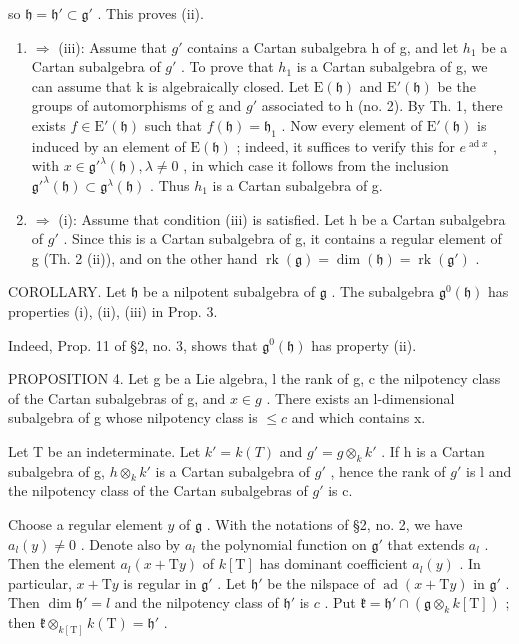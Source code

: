 so \(\mathfrak{h} = \mathfrak{h}'\subset \mathfrak{g}'\) . This proves (ii).

\begin{enumerate}
\def\labelenumi{(\roman{enumi})}
\setcounter{enumi}{1}
\item
  \(\Longrightarrow\) (iii): Assume that \(g'\) contains a Cartan subalgebra h of g, and let \(h_{1}\) be a Cartan subalgebra of \(g'\) . To prove that \(h_{1}\) is a Cartan subalgebra of g, we can assume that k is algebraically closed. Let \(\mathrm{E}(\mathfrak{h})\) and \(\mathrm{E}'(\mathfrak{h})\) be the groups of automorphisms of g and \(g'\) associated to h (no. 2). By Th. 1, there exists \(f \in \mathrm{E}'(\mathfrak{h})\) such that \(f(\mathfrak{h}) = \mathfrak{h}_{1}\) . Now every element of \(\mathrm{E}'(\mathfrak{h})\) is induced by an element of \(\mathrm{E}(\mathfrak{h})\) ; indeed, it suffices to verify this for \(e^{\operatorname{ad} x}\) , with \(x \in \mathfrak{g}'^{\lambda}(\mathfrak{h}), \lambda \neq 0\) , in which case it follows from the inclusion \(\mathfrak{g}'^{\lambda}(\mathfrak{h}) \subset \mathfrak{g}^{\lambda}(\mathfrak{h})\) . Thus \(h_{1}\) is a Cartan subalgebra of g.
\item
  \(\Longrightarrow\) (i): Assume that condition (iii) is satisfied. Let h be a Cartan subalgebra of \(g'\) . Since this is a Cartan subalgebra of g, it contains a regular element of g (Th. 2 (ii)), and on the other hand \(\operatorname{rk}(\mathfrak{g}) = \dim(\mathfrak{h}) = \operatorname{rk}(\mathfrak{g}')\) .
\end{enumerate}

COROLLARY. Let \(\mathfrak{h}\) be a nilpotent subalgebra of \(\mathfrak{g}\) . The subalgebra \(\mathfrak{g}^0 (\mathfrak{h})\) has properties (i), (ii), (iii) in Prop. 3.

Indeed, Prop. 11 of §2, no. 3, shows that \(\mathfrak{g}^0 (\mathfrak{h})\) has property (ii).

PROPOSITION 4. Let g be a Lie algebra, l the rank of g, c the nilpotency class of the Cartan subalgebras of g, and \(x \in g\) . There exists an l-dimensional subalgebra of g whose nilpotency class is \(\leq c\) and which contains x.

Let T be an indeterminate. Let \(k' = k(T)\) and \(g' = g \otimes_k k'\) . If h is a Cartan subalgebra of g, \(h \otimes_k k'\) is a Cartan subalgebra of \(g'\) , hence the rank of \(g'\) is l and the nilpotency class of the Cartan subalgebras of \(g'\) is c.

Choose a regular element \(y\) of \(\mathfrak{g}\) . With the notations of §2, no. 2, we have \(a_l(y) \neq 0\) . Denote also by \(a_l\) the polynomial function on \(\mathfrak{g}'\) that extends \(a_l\) . Then the element \(a_l(x + \mathrm{T}y)\) of \(k[\mathrm{T}]\) has dominant coefficient \(a_l(y)\) . In particular, \(x + \mathrm{T}y\) is regular in \(\mathfrak{g}'\) . Let \(\mathfrak{h}'\) be the nilspace of \(\operatorname{ad}(x + \mathrm{T}y)\) in \(\mathfrak{g}'\) . Then \(\dim \mathfrak{h}' = l\) and the nilpotency class of \(\mathfrak{h}'\) is \(c\) . Put \(\mathfrak{k} = \mathfrak{h}' \cap (\mathfrak{g} \otimes_k k[\mathrm{T}])\) ; then \(\mathfrak{k} \otimes_{k[\mathrm{T}]} k(\mathrm{T}) = \mathfrak{h}'\) .

